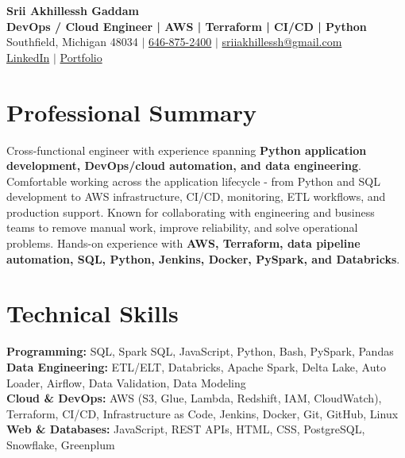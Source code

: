 \documentclass[letterpaper,10pt]{article}
\begin{document}
\fontsize{9.35pt}{10.45pt}\selectfont

\begin{center}
    {\LARGE \textbf{Srii Akhillessh Gaddam}} \\[-1pt]
    \textbf{DevOps / Cloud Engineer | AWS | Terraform | CI/CD | Python} \\[2pt]
    Southfield, Michigan 48034 $|$
    \href{tel:6468752400}{646-875-2400} $|$
    \href{mailto:sriiakhillessh@gmail.com}{sriiakhillessh@gmail.com} \\[1pt]
    \href{https://www.linkedin.com/in/srii-akhiilessh-gaddam-b48668191/}{LinkedIn} $|$
    \href{https://sriiakhillesshg.github.io/portfolio/}{Portfolio}
\end{center}
\vspace{-8pt}

\section{Professional Summary}
\small{Cross-functional engineer with experience spanning \textbf{Python application development, DevOps/cloud automation, and data engineering}. Comfortable working across the application lifecycle - from Python and SQL development to AWS infrastructure, CI/CD, monitoring, ETL workflows, and production support. Known for collaborating with engineering and business teams to remove manual work, improve reliability, and solve operational problems. Hands-on experience with \textbf{AWS, Terraform, data pipeline automation, SQL, Python, Jenkins, Docker, PySpark, and Databricks}.}

\section{Technical Skills}
\small{
\textbf{Programming:} SQL, Spark SQL, JavaScript, Python, Bash, PySpark, Pandas \\
\textbf{Data Engineering:} ETL/ELT, Databricks, Apache Spark, Delta Lake, Auto Loader, Airflow, Data Validation, Data Modeling \\
\textbf{Cloud \& DevOps:} AWS (S3, Glue, Lambda, Redshift, IAM, CloudWatch), Terraform, CI/CD, Infrastructure as Code, Jenkins, Docker, Git, GitHub, Linux \\
\textbf{Web \& Databases:} JavaScript, REST APIs, HTML, CSS, PostgreSQL, Snowflake, Greenplum
}
\end{document}
